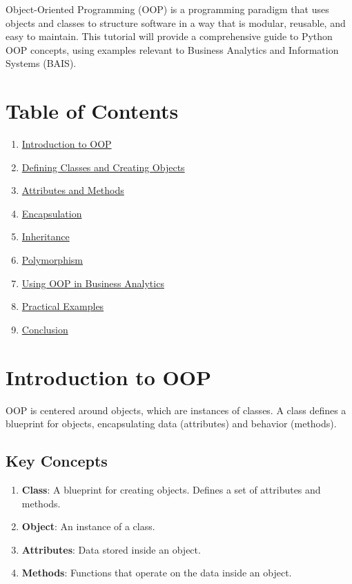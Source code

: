 \documentclass[
  letterpaper,
  DIV=11,
  numbers=noendperiod]{scrreprt}
\providecommand{\tightlist}{%
  \setlength{\itemsep}{0pt}\setlength{\parskip}{0pt}}\usepackage{longtable,booktabs,array}
\begin{document}
Object-Oriented Programming (OOP) is a programming paradigm that uses
objects and classes to structure software in a way that is modular,
reusable, and easy to maintain. This tutorial will provide a
comprehensive guide to Python OOP concepts, using examples relevant to
Business Analytics and Information Systems (BAIS).

\section{Table of Contents}\label{table-of-contents-7}

\begin{enumerate}
\def\labelenumi{\arabic{enumi}.}
\tightlist
\item
  \hyperref[introduction-to-oop]{Introduction to OOP}
\item
  \hyperref[defining-classes-and-creating-objects]{Defining Classes and
  Creating Objects}
\item
  \hyperref[attributes-and-methods]{Attributes and Methods}
\item
  \hyperref[encapsulation]{Encapsulation}
\item
  \hyperref[inheritance]{Inheritance}
\item
  \hyperref[polymorphism]{Polymorphism}
\item
  \hyperref[using-oop-in-business-analytics]{Using OOP in Business
  Analytics}
\item
  \hyperref[practical-examples]{Practical Examples}
\item
  \hyperref[conclusion]{Conclusion}
\end{enumerate}

\section{Introduction to OOP}\label{introduction-to-oop}

OOP is centered around objects, which are instances of classes. A class
defines a blueprint for objects, encapsulating data (attributes) and
behavior (methods).

\subsection{Key Concepts}\label{key-concepts}

\begin{enumerate}
\def\labelenumi{\arabic{enumi}.}
\tightlist
\item
  \textbf{Class}: A blueprint for creating objects. Defines a set of
  attributes and methods.
\item
  \textbf{Object}: An instance of a class.
\item
  \textbf{Attributes}: Data stored inside an object.
\item
  \textbf{Methods}: Functions that operate on the data inside an object.
\end{enumerate}
\end{document}
